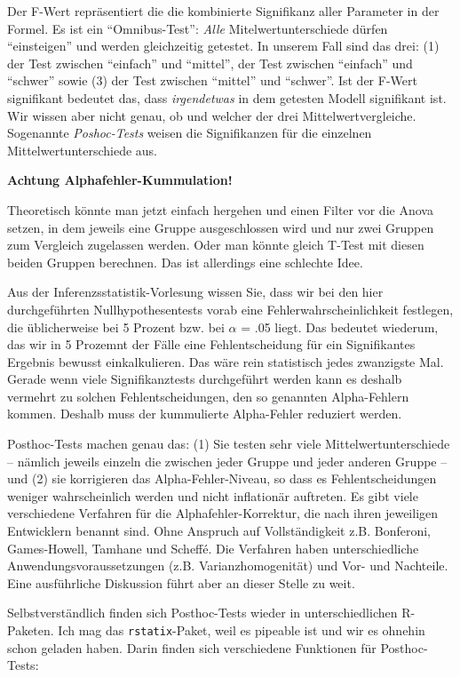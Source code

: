 \documentclass[
]{book}
\begin{document}
Der F-Wert repräsentiert die die kombinierte Signifikanz aller Parameter in der Formel. Es ist ein ``Omnibus-Test'': \emph{Alle} Mitelwertunterschiede dürfen ``einsteigen'' und werden gleichzeitig getestet. In unserem Fall sind das drei: (1) der Test zwischen ``einfach'' und ``mittel'', der Test zwischen ``einfach'' und ``schwer'' sowie (3) der Test zwischen ``mittel'' und ``schwer''. Ist der F-Wert signifikant bedeutet das, dass \emph{irgendetwas} in dem getesten Modell signifikant ist. Wir wissen aber nicht genau, ob und welcher der drei Mittelwertvergleiche. Sogenannte \emph{Poshoc-Tests} weisen die Signifikanzen für die einzelnen Mittelwertunterschiede aus.

\leavevmode\hypertarget{info_levenef}{}%
\textbf{Achtung Alphafehler-Kummulation!}

Theoretisch könnte man jetzt einfach hergehen und einen Filter vor die Anova setzen, in dem jeweils eine Gruppe ausgeschlossen wird und nur zwei Gruppen zum Vergleich zugelassen werden. Oder man könnte gleich T-Test mit diesen beiden Gruppen berechnen. Das ist allerdings eine schlechte Idee.

Aus der Inferenzsstatistik-Vorlesung wissen Sie, dass wir bei den hier durchgeführten Nullhypothesentests vorab eine Fehlerwahrscheinlichkeit festlegen, die üblicherweise bei 5 Prozent bzw. bei \(\alpha\) = .05 liegt. Das bedeutet wiederum, das wir in 5 Prozemnt der Fälle eine Fehlentscheidung für ein Signifikantes Ergebnis bewusst einkalkulieren. Das wäre rein statistisch jedes zwanzigste Mal. Gerade wenn viele Signifikanztests durchgeführt werden kann es deshalb vermehrt zu solchen Fehlentscheidungen, den so genannten Alpha-Fehlern kommen. Deshalb muss der kummulierte Alpha-Fehler reduziert werden.

Posthoc-Tests machen genau das: (1) Sie testen sehr viele Mittelwertunterschiede -- nämlich jeweils einzeln die zwischen jeder Gruppe und jeder anderen Gruppe -- und (2) sie korrigieren das Alpha-Fehler-Niveau, so dass es Fehlentscheidungen weniger wahrscheinlich werden und nicht inflationär auftreten. Es gibt viele verschiedene Verfahren für die Alphafehler-Korrektur, die nach ihren jeweiligen Entwicklern benannt sind. Ohne Anspruch auf Vollständigkeit z.B. Bonferoni, Games-Howell, Tamhane und Scheffé. Die Verfahren haben unterschiedliche Anwendungsvoraussetzungen (z.B. Varianzhomogenität) und Vor- und Nachteile. Eine ausführliche Diskussion führt aber an dieser Stelle zu weit.

Selbstverständlich finden sich Posthoc-Tests wieder in unterschiedlichen R-Paketen. Ich mag das \texttt{rstatix}-Paket, weil es pipeable ist und wir es ohnehin schon geladen haben. Darin finden sich verschiedene Funktionen für Posthoc-Tests:
\end{document}
